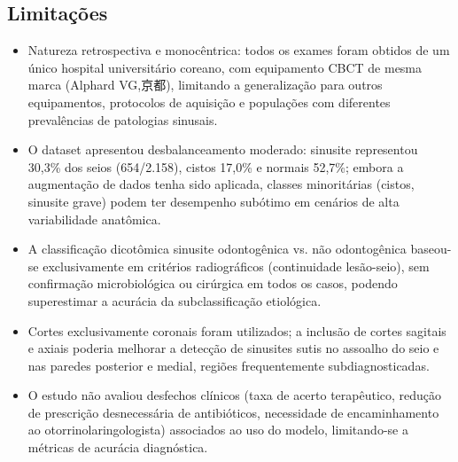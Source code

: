 \subsection{Limitações}
\begin{itemize}
  \item Natureza retrospectiva e monocêntrica: todos os exames foram
        obtidos de um único hospital universitário coreano, com
        equipamento CBCT de mesma marca (Alphard VG,京都), limitando
        a generalização para outros equipamentos, protocolos de
        aquisição e populações com diferentes prevalências de patologias
        sinusais.
  \item O dataset apresentou desbalanceamento moderado: sinusite
        representou 30,3\% dos seios (654/2.158), cistos 17,0\% e
        normais 52,7\%; embora a augmentação de dados tenha sido
        aplicada, classes minoritárias (cistos, sinusite grave)
        podem ter desempenho subótimo em cenários de alta
        variabilidade anatômica.
  \item A classificação dicotômica sinusite odontogênica vs. não
        odontogênica baseou-se exclusivamente em critérios
        radiográficos (continuidade lesão-seio), sem confirmação
        microbiológica ou cirúrgica em todos os casos, podendo
        superestimar a acurácia da subclassificação etiológica.
  \item Cortes exclusivamente coronais foram utilizados; a inclusão
        de cortes sagitais e axiais poderia melhorar a detecção de
        sinusites sutis no assoalho do seio e nas paredes posterior
        e medial, regiões frequentemente subdiagnosticadas.
  \item O estudo não avaliou desfechos clínicos (taxa de acerto
        terapêutico, redução de prescrição desnecessária de
        antibióticos, necessidade de encaminhamento ao
        otorrinolaringologista) associados ao uso do modelo,
        limitando-se a métricas de acurácia diagnóstica.
\end{itemize}

